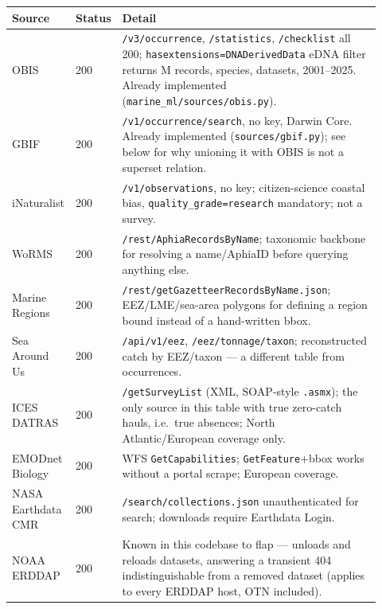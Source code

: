 \begin{wtable}
\centering
\tabscale
\caption{Tier 1: open REST/JSON (or equivalent) sources, no key required for
reads, occurrence- or dataset-shaped. All probed \ProbeDate{} unless a
re-probe date is noted; \NTableRowsOpen{} rows cover \NTierOne{} sources.}
\label{tab:open}
\begin{tabular}{p{0.14\linewidth}p{0.08\linewidth}p{0.70\linewidth}}
\toprule
Source & Status & Detail \\
\midrule
OBIS & 200 & \texttt{/v3/occurrence}, \texttt{/statistics}, \texttt{/checklist} all 200; \texttt{hasextensions=DNADerivedData} eDNA filter returns \ObisEdnaRecordsM{}M records, \ObisEdnaSpecies{} species, \ObisEdnaDatasets{} datasets, 2001--2025. Already implemented (\texttt{marine\_ml/sources/obis.py}). \\
GBIF & 200 & \texttt{/v1/occurrence/search}, no key, Darwin Core. Already implemented (\texttt{sources/gbif.py}); see below for why unioning it with OBIS is not a superset relation. \\
iNaturalist & 200 & \texttt{/v1/observations}, no key; citizen-science coastal bias, \texttt{quality\_grade=research} mandatory; not a survey. \\
WoRMS & 200 & \texttt{/rest/AphiaRecordsByName}; taxonomic backbone for resolving a name/AphiaID before querying anything else. \\
Marine Regions & 200 & \texttt{/rest/getGazetteerRecordsByName.json}; EEZ/LME/sea-area polygons for defining a region bound instead of a hand-written bbox. \\
Sea Around Us & 200 & \texttt{/api/v1/eez}, \texttt{/eez/tonnage/taxon}; reconstructed catch by EEZ/taxon --- a different table from occurrences. \\
ICES DATRAS & 200 & \texttt{/getSurveyList} (XML, SOAP-style \texttt{.asmx}); the only source in this table with true zero-catch hauls, i.e.\ true absences; North Atlantic/European coverage only. \\
EMODnet Biology & 200 & WFS \texttt{GetCapabilities}; \texttt{GetFeature}+bbox works without a portal scrape; European coverage. \\
NASA Earthdata CMR & 200 & \texttt{/search/collections.json} unauthenticated for search; downloads require Earthdata Login. \\
NOAA ERDDAP & 200 & Known in this codebase to flap --- unloads and reloads datasets, answering a transient 404 indistinguishable from a removed dataset (applies to every ERDDAP host, OTN included). \\

\end{tabular}
\end{wtable}

